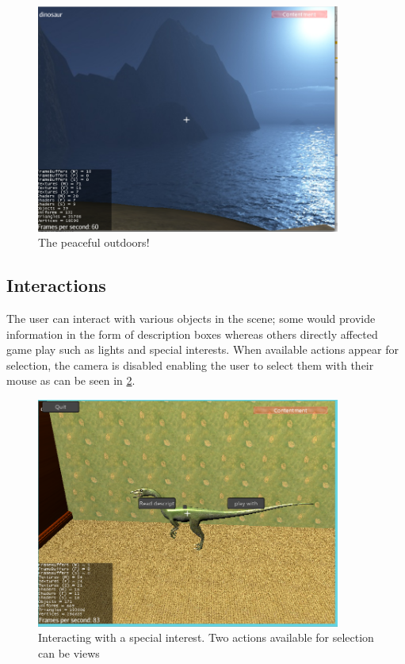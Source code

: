 \documentclass[11pt]{report}
\begin{document}
\begin{figure}[H]
\centering
\includegraphics[width=100mm]{images/prototype/outside.png}
\caption{The peaceful outdoors!}
\label{prototype_kitchen1}
\end{figure}

\subsection*{Interactions}

The user can interact with various objects in the scene; some would provide information in the form of description boxes whereas others directly affected game play such as lights and special interests. When available actions appear for selection, the camera is disabled enabling the user to select them with their mouse as can be seen in \ref{prototype_dino}.

\begin{figure}[H]
\centering
\includegraphics[width=100mm]{images/prototype/si.png}
\caption{Interacting with a special interest. Two actions available for selection can be views}
\label{prototype_dino}
\end{figure}
\end{document}

